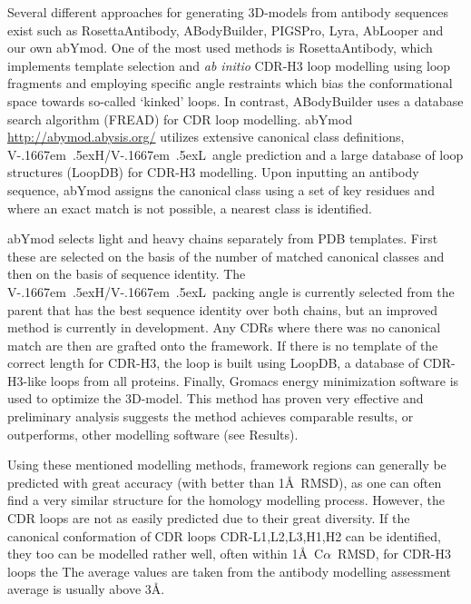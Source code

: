 \documentclass[12pt]{article}
\newcommand{\ca}{\mbox{C$\alpha$}}
\newcommand{\VH}{\mbox{V\kern-.1667em \lower.5ex\hbox{\scriptsize H}}}
\newcommand{\VL}{\mbox{V\kern-.1667em \lower.5ex\hbox{\scriptsize L}}}
\newcommand{\VHVL}{\mbox{\VH/\VL}}
\begin{document}
Several different approaches for generating 
3D-models from antibody sequences exist such as
RosettaAntibody\cite{Sircar2009,Sivasubramanian2009}, 
ABodyBuilder\cite{Leem2016}, PIGSPro\cite{Lepore2017}, Lyra\cite{Klausen2015}, AbLooper\cite{Abanades2022} and our own abYmod.
One of the most
used methods is RosettaAntibody, which implements template selection
and \emph{ab initio} CDR-H3 loop modelling using loop fragments and employing
specific angle restraints which bias the conformational space towards
so-called `kinked' loops\cite{Schoeder2021,Weitzner2017}. In
contrast, ABodyBuilder uses a database search algorithm
(FREAD\cite{Choi2010}) for CDR loop modelling.
abYmod \url{http://abymod.abysis.org/} utilizes extensive canonical
class definitions, \VHVL\ angle prediction and a large database of loop
structures (LoopDB) for CDR-H3 modelling.
Upon inputting an antibody sequence, abYmod assigns the
canonical class using a set of key residues\cite{Martin1996} and where
an exact match is not possible, a nearest class is identified.

abYmod selects light and heavy chains separately from PDB templates.
First these are selected on the basis of the number of matched
canonical classes and then on the basis of sequence identity.  The
\VHVL\ packing angle is currently selected from the parent that has
the best sequence identity over both chains, but an improved method is
currently in development. Any CDRs where there was no canonical match are then
are grafted onto the framework. If there is no template of the correct
length for CDR-H3, the loop is built using LoopDB, a database of
CDR-H3-like loops from all proteins. Finally, Gromacs energy
minimization software is used to optimize the 3D-model. This method has
proven very effective and preliminary analysis suggests the method
achieves comparable results, or outperforms, other modelling software
(see Results).

Using these mentioned modelling methods, framework regions can
generally be predicted with great accuracy (with better than 1\AA\
RMSD\cite{Almagro2014}), as one can often find a very similar
structure for the homology modelling process.  However, the CDR loops
are not as easily predicted due to their great diversity. If the
canonical conformation of CDR loops CDR-L1,L2,L3,H1,H2 can be identified, they too
can be modelled rather well, often within 1\AA\ \ca~RMSD, for CDR-H3 loops
the The average values are taken from the antibody modelling assessment average is usually above 3\AA\cite{Almagro2011}.
\end{document}
